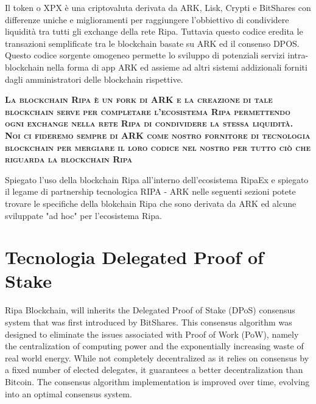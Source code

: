 \documentclass[11pt,fleqn,oneside]{book} %
\begin{document}
Il token \PHP o XPX è una criptovaluta derivata da ARK, Lisk, Crypti e BitShares con differenze uniche e miglioramenti per 
raggiungere l'obbiettivo di condividere liquidità tra tutti gli exchange della rete Ripa. Tuttavia questo codice eredita
le transazioni semplificate tra le blockchain basate su ARK ed il consenso DPOS. Questo codice sorgente omogeneo 
permette lo sviluppo di potenziali servizi intra-blockchain nella forma di app ARK ed assieme ad altri sistemi addizionali
forniti dagli amministratori delle blockchain rispettive.

\vspace{5mm}
\textsc{\textbf{La blockchain Ripa è un fork di ARK e la creazione di tale blockchain serve per completare l'ecosistema Ripa
permettendo ogni exchange nella rete Ripa di condividere la stessa liquidità. Noi ci fideremo sempre di ARK come nostro
fornitore di tecnologia blockchain per mergiare il loro codice nel nostro per tutto ciò che riguarda la blockchain Ripa}}

\vspace{5mm}

Spiegato l'uso della blockchain Ripa all'interno dell'ecosistema RipaEx e spiegato il legame di partnership tecnologica
RIPA - ARK nelle seguenti sezioni potete trovare le specifiche della blokchain Ripa che sono derivata da ARK ed alcune sviluppate 
"ad hoc" per l'ecosistema Ripa.

\section{Tecnologia Delegated Proof of Stake}
Ripa Blockchain, will inherits the Delegated Proof of Stake (DPoS) consensus system that was first introduced
by BitShares. This consensus algorithm was designed to eliminate the issues associated with Proof of Work (PoW), 
namely the centralization of computing power and the exponentially increasing waste of real world energy. While not
completely decentralized as it relies on consensus by a fixed number of elected delegates, it guarantees a better decentralization 
than Bitcoin. The consensus algorithm implementation is improved over time, evolving into an optimal consensus system.\\
\end{document}
